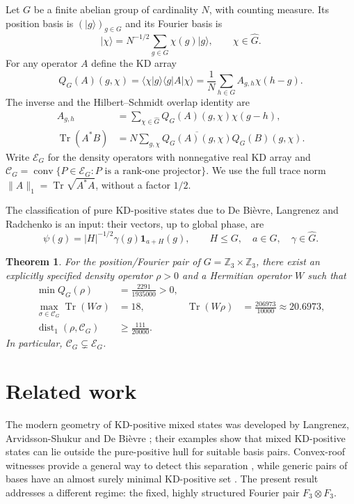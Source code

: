 \documentclass[11pt,a4paper]{article}
\newtheorem{theorem}{Theorem}
\theoremstyle{definition}
\theoremstyle{plain}
\newenvironment{statementframe}{%
  \par\addvspace{0.55\baselineskip}\noindent
  \begingroup\setlength{\fboxrule}{0.3pt}\setlength{\fboxsep}{7pt}%
  \begin{lrbox}{\statementbox}%
  \begin{minipage}{\dimexpr\linewidth-2\fboxsep-2\fboxrule\relax}%
}{%
  \end{minipage}\end{lrbox}%
  {\color{black!45}\fbox{\color{black}\usebox{\statementbox}}}%
  \endgroup\par\addvspace{0.45\baselineskip}%
}
\DeclareMathOperator{\Tr}{Tr}
\DeclareMathOperator{\conv}{conv}
\DeclareMathOperator{\dist}{dist}
\newcommand{\Z}{\mathbb Z}
\newcommand{\E}{\mathcal E}
\newcommand{\hull}{\mathcal C}
\newcommand{\ket}[1]{\lvert#1\rangle}
\newcommand{\bra}[1]{\langle#1\rvert}
\begin{document}
Let $G$ be a finite abelian group of cardinality $N$, with counting measure.
Its position basis is $(\ket g)_{g\in G}$ and its Fourier basis is
\[
 \ket\chi=N^{-1/2}\sum_{g\in G}\chi(g)\ket g,
 \qquad \chi\in\widehat G.
\]
For any operator $A$ define the KD array
\begin{equation}\label{eq:KD}
 Q_G(A)(g,\chi)=\bra\chi g\rangle\bra g A\ket\chi
 =\frac1N\sum_{h\in G}A_{g,h}\chi(h-g).
\end{equation}
The inverse and the Hilbert--Schmidt overlap identity are
\begin{align}
 A_{g,h}&=\sum_{\chi\in\widehat G}Q_G(A)(g,\chi)\chi(g-h),\label{eq:inverse}\\
 \Tr(A^*B)&=N\sum_{g,\chi}\overline{Q_G(A)(g,\chi)}Q_G(B)(g,\chi).
 \label{eq:overlap}
\end{align}
Write $\E_G$ for the density operators with nonnegative real KD array and
$\hull_G=\conv\{P\in\E_G:P\text{ is a rank-one projector}\}$.
We use the full trace norm $\|A\|_1=\Tr\sqrt{A^*A}$, without a factor $1/2$.

The classification of pure KD-positive states due to
De Bi\`evre, Langrenez and Radchenko \cite{DLR} is an input:
their vectors, up to global phase, are
\begin{equation}\label{eq:pures}
 \psi(g)=|H|^{-1/2}\gamma(g)\mathbf1_{a+H}(g),
 \qquad H\leq G,\quad a\in G,\quad\gamma\in\widehat G.
\end{equation}

\begin{statementframe}
\begin{theorem}\label{thm:example}
For the position/Fourier pair of $G=\Z_3\times\Z_3$, there exist an explicitly
specified density operator $\rho>0$ and a Hermitian operator $W$ such that
\begin{align}
 \min Q_G(\rho)&=\frac{2291}{1935000}>0,\label{eq:minQ}\\
 \max_{\sigma\in\hull_G}\Tr(W\sigma)&=18,
 &\Tr(W\rho)&=\frac{206973}{10000}\approx20.6973,\label{eq:gap}\\
 \dist_1(\rho,\hull_G)&\geq\frac{111}{20000}.\label{eq:distance}
\end{align}
In particular, $\hull_G\subsetneq\E_G$.
\end{theorem}
\end{statementframe}

\section{Related work}
The modern geometry of KD-positive mixed states was developed by Langrenez,
Arvidsson-Shukur and De Bi\`evre \cite{geometry}; their examples show that
mixed KD-positive states can lie outside the pure-positive hull for suitable
basis pairs. Convex-roof witnesses provide a general way to detect this
separation \cite{convexroof}, while generic pairs of bases have an almost
surely minimal KD-positive set \cite{almost}. The present result addresses a
different regime: the fixed, highly structured Fourier pair
$F_3\otimes F_3$.
\end{document}
